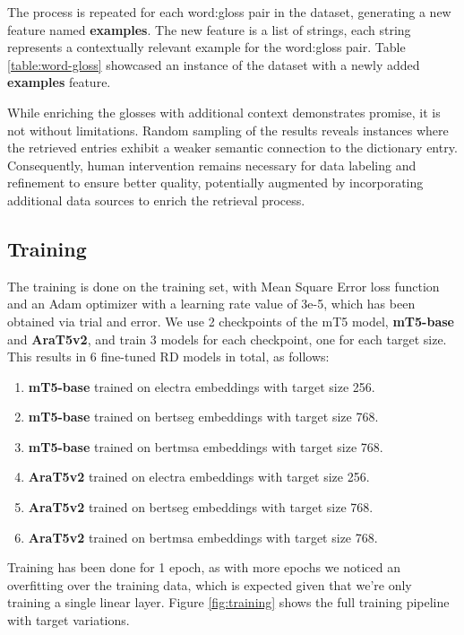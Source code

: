 \documentclass[12.5pt]{article}
\begin{document}
The process is repeated for each word:gloss pair in the dataset, generating a new feature named \textbf{examples}. The new feature is a list of strings, each string represents a contextually relevant example for the word:gloss pair. Table \ref{table:word-gloss} showcased an instance of the dataset with a newly added \textbf{examples} feature.

While enriching the glosses with additional context demonstrates promise, it is not without limitations. Random sampling of the results reveals instances where the retrieved entries exhibit a weaker semantic connection to the dictionary entry. Consequently, human intervention remains necessary for data labeling and refinement to ensure better quality, potentially augmented by incorporating additional data sources to enrich the retrieval process.

\subsection{Training}

The training is done on the training set, with Mean Square Error loss function and an Adam optimizer with a learning rate value of 3e-5, which has been obtained via trial and error. We use 2 checkpoints of the mT5 model, \textbf{mT5-base} and \textbf{AraT5v2}, and train 3 models for each checkpoint, one for each target size. This results in 6 fine-tuned RD models in total, as follows:

\begin{enumerate}
    \item \textbf{mT5-base} trained on electra embeddings with target size 256.
    \item \textbf{mT5-base} trained on bertseg embeddings with target size 768.
    \item \textbf{mT5-base} trained on bertmsa embeddings with target size 768.
    \item \textbf{AraT5v2} trained on electra embeddings with target size 256.
    \item \textbf{AraT5v2} trained on bertseg embeddings with target size 768.
    \item \textbf{AraT5v2} trained on bertmsa embeddings with target size 768.
\end{enumerate}

Training has been done for 1 epoch, as with more epochs we noticed an overfitting over the training data, which is expected given that we’re only training a single linear layer. Figure \ref{fig:training} shows the full training pipeline with target variations.
\end{document}
